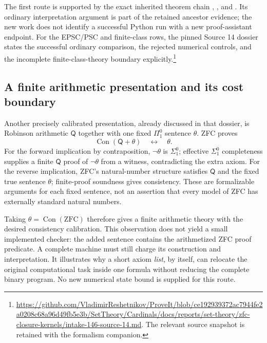 The first route is supported by the exact inherited theorem chain
,
, and
.
Its ordinary interpretation argument is part of the retained ancestor
evidence; the new work does not identify a successful Python run with
a new proof-assistant endpoint.  For the EPSC/PSC and finite-class
rows, the pinned Source 14 dossier states the successful ordinary
comparison, the rejected numerical controls, and the incomplete
finite-class-theory boundary explicitly.\footnote{
\url{https://github.com/VladimirReshetnikov/ProveIt/blob/ce192939372ac7944fe2a0208c68a96d49fb5e3b/SetTheory/Cardinals/docs/reports/set-theory/zfc-closure-kernels/intake-146-source-14.md}.
The relevant source snapshot is retained with the formalism companion.}

\subsection{A finite arithmetic presentation and its cost boundary}

Another precisely calibrated presentation, already discussed in that
dossier, is Robinson arithmetic $\mathsf Q$ together with one fixed
$\Pi^0_1$ sentence $\theta$.  ZFC proves
\[
 \operatorname{Con}(\mathsf Q+\theta)\quad\longleftrightarrow\quad\theta.
\]
For the forward implication by contraposition, $\neg\theta$ is
$\Sigma^0_1$; effective $\Sigma^0_1$ completeness supplies a finite
$\mathsf Q$ proof of $\neg\theta$ from a witness, contradicting the
extra axiom.  For the reverse implication, ZFC's natural-number
structure satisfies $\mathsf Q$ and the fixed true sentence $\theta$;
finite-proof soundness gives consistency.  These are formalizable
arguments for each fixed sentence, not an assertion that every model
of ZFC has externally standard natural numbers.

Taking $\theta=\operatorname{Con}(\mathrm{ZFC})$ therefore gives a
finite arithmetic theory with the desired consistency calibration.
This observation does not yield a small implemented checker: the added
sentence contains the arithmetized ZFC proof predicate.  A complete
machine must still charge its construction and interpretation.  It
illustrates why a short axiom \emph{list}, by itself, can relocate the
original computational task inside one formula without reducing the
complete binary program.  No new numerical state bound is supplied
for this route.

